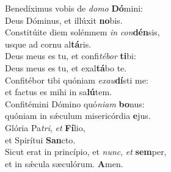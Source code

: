 \oddverse Benedíximus vobis de \textit{do}\textit{mo} \textbf{Dó}mini:~\*\\
\oddverse Deus Dóminus, et illúxit \textbf{no}bis.\\
\evenverse Constitúite diem solémnem \textit{in} \textit{con}\textbf{dén}sis,~\*\\
\evenverse usque ad cornu al\textbf{tá}ris.\\
\oddverse Deus meus es tu, et confi\textit{té}\textit{bor} \textbf{ti}bi:~\*\\
\oddverse Deus meus es tu, et exal\textbf{tá}bo te.\\
\evenverse Confitébor tibi quóniam \textit{e}\textit{xau}\textbf{dí}sti me:~\*\\
\evenverse et factus es mihi in sa\textbf{lú}tem.\\
\oddverse Confitémini Dómino quó\textit{ni}\textit{am} \textbf{bo}nus:~\*\\
\oddverse quóniam in sǽculum misericórdia \textbf{e}jus.\\
\evenverse Glória Pa\textit{tri}, \textit{et} \textbf{Fí}lio,~\*\\
\evenverse et Spirítui \textbf{San}cto.\\
\oddverse Sicut erat in princípio, et \textit{nunc}, \textit{et} \textbf{sem}per,~\*\\
\oddverse et in sǽcula sæculórum. \textbf{A}men.\\
